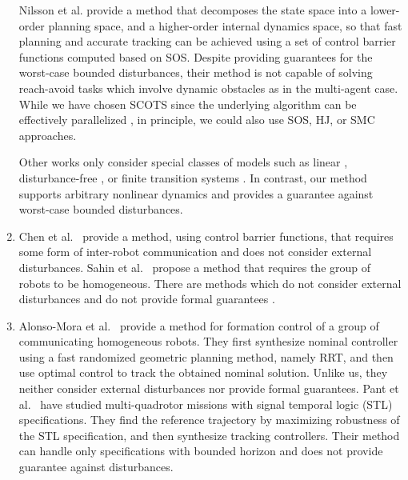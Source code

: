 \begin{enumerate}[(1)]
Nilsson et al. \cite{Nilsson:2018} provide a method that decomposes the state space into a lower-order planning space, and a higher-order internal dynamics space, so that fast planning and accurate tracking can be achieved using a set of control barrier functions computed based on SOS. Despite providing guarantees for the worst-case bounded disturbances, their method is not capable of solving reach-avoid tasks which involve dynamic obstacles as in the multi-agent case.
While we have chosen SCOTS since the underlying algorithm can be effectively parallelized \cite{KhaledZ19pfaces}, in principle, we could
also use SOS, HJ, or SMC approaches. %

Other works only consider special classes of models such as linear \cite{fan2018controller,wongpiromsarn2012receding,Rodionova2020LearningtoFlyLC}, 
disturbance-free \cite{tedrake2010lqr,fan2020fast,Srinivasan2018}, or finite transition systems \cite{Yang2017milp}. 
In contrast, our method supports arbitrary 
 nonlinear dynamics and provides a guarantee 
against worst-case bounded disturbances.
	\item Chen et al.\ \cite{Chen2018cbf} provide a method, using control barrier functions, that requires some form of inter-robot 
communication and does not consider external disturbances.
Sahin et al.\ \cite{Shahin2017cltl} propose a method that requires the group of robots to be homogeneous.
There are methods which do not consider external disturbances and do not provide formal guarantees \cite{jackson2020scalable}.
	\item Alonso-Mora et al.\ \cite{alonso2019distributed} provide a method for formation control of a group of communicating homogeneous robots.
They first synthesize nominal controller using a fast randomized geometric planning method, namely RRT, and 
then use optimal control to track the obtained nominal solution.
Unlike us, they neither consider external disturbances nor provide formal guarantees. Pant et al.\ \cite{Pant2018multiquad} have studied multi-quadrotor missions with signal temporal logic (STL) specifications. They find the reference trajectory by maximizing robustness of the STL specification, and then synthesize tracking controllers. Their method can handle only specifications with bounded horizon and does not provide guarantee against disturbances.


\end{enumerate}
